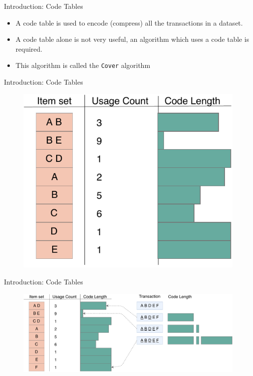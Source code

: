\documentclass{beamer}
\begin{document}
\begin{frame}{Introduction: Code Tables}
\begin{itemize}
  \item A code table is used to encode (compress) all the transactions in a dataset. 
  \item A code table alone is not very useful, an algorithm which uses a code table is required.
  \item This algorithm is called the \texttt{Cover} algorithm
\end{itemize}
\end{frame}

\begin{frame}{Introduction: Code Tables}
\begin{figure}
  \centering
  \includegraphics[width=\textwidth]{img/CodeTableExample}
  \label{fig:CodeTableExample}
\end{figure}
\end{frame}

\begin{frame}{Introduction: Code Tables}
\begin{figure}
  \centering
  \includegraphics[width=\textwidth]{img/CodeTableExample2}
  \label{fig:CodeTableExample2}
\end{figure}
\end{frame}
\end{document}
